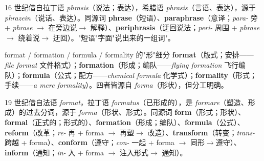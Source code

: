 \documentclass[../main.tex]{subfiles}
\begin{document}
\begin{origin}
16 世纪借自拉丁语 \textit{phrasis}（说法；表达），希腊语 \textit{phrasis}（言语、表达），源于 \textit{phrazein}（说话、表达）。同源词 \textbf{phrase}（短语）、\textbf{paraphrase}（意译；\textit{para-} 旁 + \textit{phrase} $\to$ 在旁边说$\to$ 解释）、\textbf{periphrasis}（迂回说法；\textit{peri-} 周围 + \textit{phrase} $\to$ 绕着说$\to$ 迂回）。"短语"字面"说出来的一组词"。
\end{origin}




\begin{gram}{format / formation / formula / formality 的"形"细分}
\textbf{format}（版式；安排——\textit{file format} 文件格式）；\textbf{formation}（形成；编队——\textit{flying formation} 飞行编队）；\textbf{formula}（公式；配方——\textit{chemical formula} 化学式）；\textbf{formality}（形式；手续——\textit{a mere formality}）。四者皆源自 \textit{forma}（形状），但分工明确。
\end{gram}

\begin{origin}
19 世纪借自法语 \textit{format}，拉丁语 \textit{formatus}（已形成的），是 \textit{formare}（塑造、形成）的过去分词，源于 \textit{forma}（形状、形式）。同源词 \textbf{form}（形式；形状）、\textbf{formal}（正式的；形式的）、\textbf{formation}（形成；编队）、\textbf{formula}（公式）、\textbf{reform}（改革；\textit{re-} 再 + forma $\to$ 再塑$\to$ 改造）、\textbf{transform}（转变；\textit{trans-} 跨越 + forma）、\textbf{conform}（遵守；\textit{con-} 一起 + forma $\to$ 同形$\to$遵守）、\textbf{inform}（通知；\textit{in-} 入 + forma $\to$ 注入形式$\to$ 通知）。
\end{origin}



\end{document}
